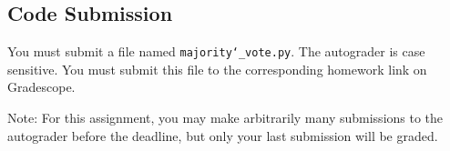 \documentclass[11pt,addpoints,answers]{exam}
\begin{document}
\subsection{Code Submission}

You must submit a file named \texttt{majority\char`_vote.py}. The autograder is case sensitive. You must submit this file to the corresponding homework link on Gradescope.

Note: For this assignment, you may make arbitrarily many submissions to the autograder before the deadline, but only your last submission will be graded.




\clearpage\clearpage
\end{document}
